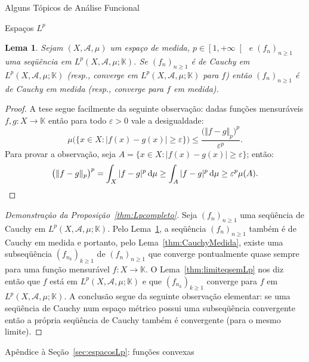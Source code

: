 \documentclass[oneside,final,11pt]{amsbook}
\newcommand{\K}{\mathds K}
\newcommand{\dd}{\mathrm d}
\theoremstyle{remark}\newtheorem{exercise}{Exercício}[chapter]
\theoremstyle{remark}\newtheorem{*exercise}[exercise]{\hbox to 0pt{\hskip 0pt minus 1fil*}Exercício}
\theoremstyle{definition}\newtheorem{exdefin}{Definição}[chapter]
\theoremstyle{plain}\newtheorem{teo}{Teorema}[section]
\theoremstyle{plain}\newtheorem{lem}[teo]{Lema}
\theoremstyle{plain}\newtheorem{prop}[teo]{Proposição}
\theoremstyle{plain}\newtheorem{cor}[teo]{Corolário}
\theoremstyle{definition}\newtheorem{defin}[teo]{Definição}
\theoremstyle{remark}\newtheorem{rem}[teo]{Observação}
\theoremstyle{definition}\newtheorem{notation}[teo]{Notação}
\theoremstyle{definition}\newtheorem{convention}[teo]{Convenção}
\theoremstyle{definition}\newtheorem{example}[teo]{Exemplo}
\numberwithin{section}{chapter}
\numberwithin{equation}{section}
\begin{document}
\begin{chapter}{Alguns Tópicos de Análise Funcional}
\begin{section}[Espaços $L^p$]{Espaços ${L^p}$}
\begin{lem}\label{thm:LemaLpmedida}
Sejam $(X,\mathcal A,\mu)$ um espaço de medida, $p\in\left[1,+\infty\right[$ e
$(f_n)_{n\ge1}$ uma seqüência em $L^p(X,\mathcal A,\mu;\K)$.
Se $(f_n)_{n\ge1}$ é de Cauchy em
$L^p(X,\mathcal A,\mu;\K)$ (resp., converge em $L^p(X,\mathcal A,\mu;\K)$ para $f$) então $(f_n)_{n\ge1}$
é de Cauchy em medida (resp., converge para $f$ em medida).
\end{lem}
\begin{proof}
A tese segue facilmente da seguinte observação: dadas funções mensuráveis $f,g:X\to\K$ então para todo
$\varepsilon>0$ vale a desigualdade:
\[\mu\Big(\big\{x\in X:\big\vert f(x)-g(x)\big\vert\ge\varepsilon\big\}\Big)\le\frac{\big(\Vert f-g\Vert_p\big)^p}{\varepsilon^p}.\]
Para provar a observação, seja $A=\big\{x\in X:\big\vert f(x)-g(x)\big\vert\ge\varepsilon\big\}$; então:
\[\big(\Vert f-g\Vert_p\big)^p=\int_X\vert f-g\vert^p\,\dd\mu\ge\int_A\vert f-g\vert^p\,\dd\mu\ge\varepsilon^p\mu(A).\qedhere\]
\end{proof}

\begin{proof}[Demonstração da Proposição~\ref{thm:Lpcompleto}]
Seja $(f_n)_{n\ge1}$ uma seqüência de Cauchy em $L^p(X,\mathcal A,\mu;\K)$. Pelo Lema~\ref{thm:LemaLpmedida},
a seqüência $(f_n)_{n\ge1}$ tam\-bém é de Cauchy em medida e portanto, pelo Lema~\ref{thm:CauchyMedida},
existe uma subseqüência $(f_{n_k})_{k\ge1}$ de $(f_n)_{n\ge1}$ que converge pontualmente quase sempre
para uma função mensurável $f:X\to\K$. O Lema~\ref{thm:limiteqsemLp} nos diz então que
$f$ está em $L^p(X,\mathcal A,\mu;\K)$ e que $(f_{n_k})_{k\ge1}$ converge para $f$ em
$L^p(X,\mathcal A,\mu;\K)$. A conclusão segue da seguinte observação elementar: se uma seqüência de Cauchy
num espaço métrico possui uma subseqüência convergente então a própria seqüência de Cauchy também é convergente
(para o mesmo limite).
\end{proof}

\end{section}

\begin{section}{Apêndice à Seção~\ref{sec:espacosLp}: funções convexas}
\label{sec:convexas}


\end{section}
\end{chapter}
\end{document}
